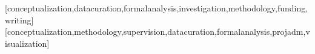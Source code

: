 \documentclass[portuguese]{textolivre}
\begin{document}
\begin{polyabstract}
\begin{english}
\begin{abstract}
\end{abstract}
\end{english}
\end{polyabstract}









\printbibliography\label{sec-bib}
\begin{contributors}
[conceptualization,datacuration,formalanalysis,investigation,methodology,funding,writing]
[conceptualization,methodology,supervision,datacuration,formalanalysis,projadm,visualization]
\end{contributors}
\end{document}
